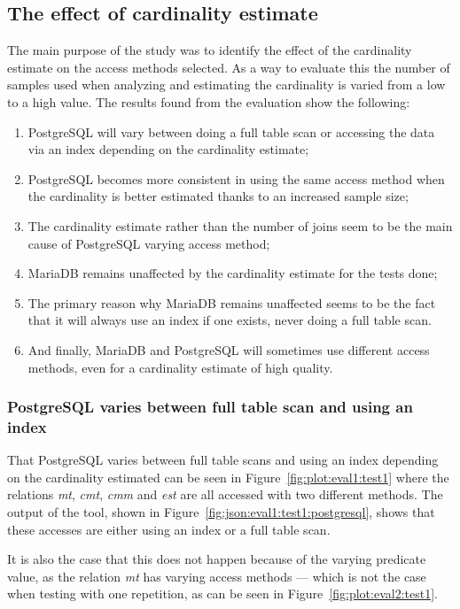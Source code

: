 \subsection{The effect of cardinality estimate}
The main purpose of the study was to identify the effect of the cardinality
estimate on the access methods selected. As a way to evaluate this the number of
samples used when analyzing and estimating the cardinality is varied from a low
to a high value. The results found from the evaluation show the following:
\begin{enumerate}
\item PostgreSQL will vary between doing a full table scan or accessing the data
  via an index depending on the cardinality estimate;
\item PostgreSQL becomes more consistent in using the same access method when
  the cardinality is better estimated thanks to an increased sample size;
\item The cardinality estimate rather than the number of joins seem to be the
  main cause of PostgreSQL varying access method;
\item MariaDB remains unaffected by the cardinality estimate for the tests done;
\item The primary reason why MariaDB remains unaffected seems to be the fact
  that it will always use an index if one exists, never doing a full table scan.
\item And finally, MariaDB and PostgreSQL will sometimes use different access
  methods, even for a cardinality estimate of high quality.
\end{enumerate}

\subsubsection{PostgreSQL varies between full table scan and using an index}
That PostgreSQL varies between full table scans and using an index depending on
the cardinality estimated can be seen in Figure~\ref{fig:plot:eval1:test1} where
the relations \textit{mt}, \textit{cmt}, \textit{cmm} and \textit{est} are all
accessed with two different methods. The output of the tool, shown in
Figure~\ref{fig:json:eval1:test1:postgresql}, shows that these accesses are
either using an index or a full table scan.

It is also the case that this does not happen because of the varying predicate
value, as the relation \textit{mt} has varying access methods --- which is not
the case when testing with one repetition, as can be seen in
Figure~\ref{fig:plot:eval2:test1}.

